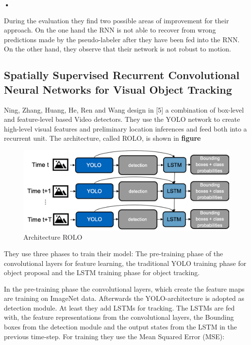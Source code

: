 \documentclass[conference]{IEEEtran}
\begin{document}
\textbf{•}

During the evaluation they find two possible areas of improvement for their approach. On the one hand the RNN is not able to recover from wrong predictions made by the pseudo-labeler after they have been fed into the RNN.  On the other hand, they observe that their network is not robust to motion. 

\subsection{Spatially Supervised Recurrent Convolutional Neural Networks for Visual Object Tracking}
Ning, Zhang, Huang, He, Ren and Wang design in [5] a combination of box-level and feature-level based Video detectors. They use the YOLO network to create high-level visual features and preliminary location inferences and feed both into a recurrent unit. The architecture, called ROLO, is shown in \textbf{figure} 

\begin{figure} [h]
\includegraphics[width=\columnwidth]{ROLO}
\caption{Architecture ROLO}
\end{figure}

They use three phases to train their model: The pre-training phase of the convolutional layers for feature learning, the traditional YOLO training phase for object proposal and the LSTM training phase for object tracking.  \newline

In the pre-training phase the convolutional layers, which create the feature maps are training on ImageNet data. Afterwards the YOLO-architecture is adopted as detection module. At least they add LSTMs for tracking. The LSTMs are fed with, the feature representations from the convolutional layers, the Bounding boxes from the detection module and the output states from the LSTM in the previous time-step. For training they use the Mean Squared Error (MSE): \newline
\end{document}
